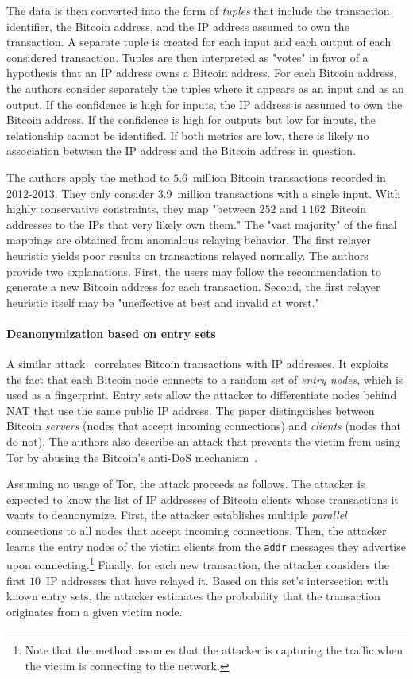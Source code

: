 The data is then converted into the form of \textit{tuples} that include the transaction identifier, the Bitcoin address, and the IP address assumed to own the transaction.
A separate tuple is created for each input and each output of each considered transaction.
Tuples are then interpreted as "votes" in favor of a hypothesis that an IP address owns a Bitcoin address.
For each Bitcoin address, the authors consider separately the tuples where it appears as an input and as an output.
If the confidence is high for inputs, the IP address is assumed to own the Bitcoin address.
If the confidence is high for outputs but low for inputs, the relationship cannot be identified.
If both metrics are low, there is likely no association between the IP address and the Bitcoin address in question.

The authors apply the method to $5.6$~million Bitcoin transactions recorded in 2012-2013.
They only consider $3.9$~million transactions with a single input.
With highly conservative constraints, they map "between $252$ and $1\,162$~Bitcoin addresses to the IPs that very likely own them."
The "vast majority" of the final mappings are obtained from anomalous relaying behavior.
The first relayer heuristic yields poor results on transactions relayed normally.
The authors provide two explanations.
First, the users may follow the recommendation to generate a new Bitcoin address for each transaction.
Second, the first relayer heuristic itself may be "uneffective at best and invalid at worst."


\paragraph{Deanonymization based on entry sets}

A similar attack~\cite{Biryukov2014} correlates Bitcoin transactions with IP addresses.
It exploits the fact that each Bitcoin node connects to a random set of \textit{entry nodes}, which is used as a fingerprint.
Entry sets allow the attacker to differentiate nodes behind NAT that use the same public IP address.
The paper distinguishes between Bitcoin \textit{servers} (nodes that accept incoming connections) and \textit{clients} (nodes that do not).
The authors also describe an attack that prevents the victim from using Tor by abusing the Bitcoin's anti-DoS mechanism~\cite{Biryukov2015}.

Assuming no usage of Tor, the attack proceeds as follows.
The attacker is expected to know the list of IP addresses of Bitcoin clients whose transactions it wants to deanonymize.
First, the attacker establishes multiple \textit{parallel} connections to all nodes that accept incoming connections.
Then, the attacker learns the entry nodes of the victim clients from the \texttt{addr} messages they advertise upon connecting.\footnote{Note that the method assumes that the attacker is capturing the traffic when the victim is connecting to the network.}
Finally, for each new transaction, the attacker considers the first $10$~IP addresses that have relayed it.
Based on this set's intersection with known entry sets, the attacker estimates the probability that the transaction originates from a given victim node.


